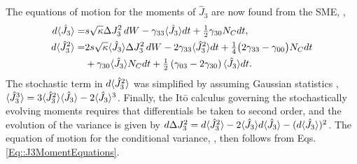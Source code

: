 \documentclass[preprint, aps,pra,onecolumn]{revtex4-1} %
\newcommand{\varz}{\Delta J_3^2}
\newcommand{\jz}{\hat{J}_3}
\begin{document}
\begin{appendix}
The equations of motion for the moments of $\jz$ are now found from the SME, ,
	\begin{subequations} \label{Eq::J3MomentEquations}
	\begin{align} 
		d \expt{\jz} =& s \sqrt{\kappa} \varz \, dW - \gamma_{33} \expt{\jz}dt + \smallfrac{1}{2} \gamma_{30} N_C dt ,  \\
		d \expt{\jz^2} =& 2 s\sqrt{\kappa} \expt{\jz}\Delta J_3^2 \, dW - 2 \gamma_{33} \expt{\jz^2}dt + \smallfrac{1}{4} \big( 2 \gamma_{33}-\gamma_{00}\big) N_C dt \\
		&+ \gamma_{30} \expt{\jz} N_C dt + \smallfrac{1}{2}\left(\gamma_{03} -2 \gamma_{30}\right) \expt{\jz} dt. \nonumber 
	\end{align}
	\end{subequations}
The stochastic term in $d\expt{\jz^2}$ was simplified by assuming Gaussian statistics \cite{jacobs_straightforward_2006}, $\expt{\jz^3} = 3\expt{\jz^2}\expt{\jz}- 2\expt{\jz}^3$. 
Finally, the It\={o} calculus governing the stochastically evolving moments requires that differentials be taken to second order, and the evolution of the variance is given by $d \varz = d \expt{\jz^2} - 2 \expt{\jz} d \expt{\jz} - ( d \expt{\jz} )^2$. 
The equation of motion for the conditional variance, , then follows from Eqs. \eqref{Eq::J3MomentEquations}.



\end{appendix}
\end{document}
